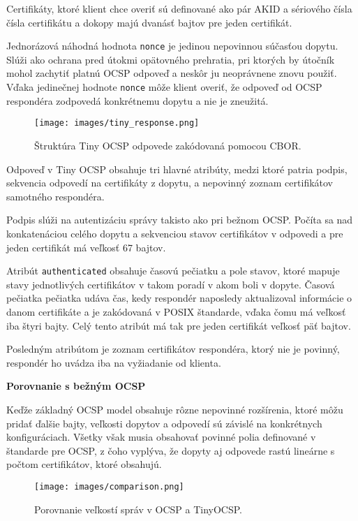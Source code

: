 \documentclass[12pt, twoside]{book}
\newcommand{\subsubsubsection}[1]{%
  \vspace{0.2em}  
  \textbf{#1} \\[0.2em]
  \hspace*{\parindent}
}
\begin{document}
Certifikáty, ktoré klient chce overiť sú definované ako pár AKID a sériového čísla 
čísla certifikátu a dokopy majú dvanásť bajtov pre jeden certifikát.

Jednorázová náhodná hodnota \texttt{nonce} je jedinou nepovinnou súčasťou dopytu.  Slúži ako ochrana pred útokmi opätovného prehratia, pri ktorých by útočník mohol zachytiť platnú OCSP odpoveď a neskôr ju neoprávnene znovu použiť. Vďaka jedinečnej hodnote \texttt{nonce} môže klient overiť, že odpoveď od OCSP respondéra zodpovedá konkrétnemu dopytu a nie je zneužitá.

\begin{figure}[H]
\centering
\texttt{[image: images/tiny\_response.png]}
\caption{Štruktúra Tiny OCSP odpovede zakódovaná pomocou CBOR.}
\end{figure}

Odpoveď v Tiny OCSP obsahuje tri hlavné atribúty, medzi ktoré patria podpis, sekvencia odpovedí na certifikáty z dopytu, a nepovinný zoznam certifikátov samotného respondéra.

Podpis slúži na autentizáciu správy takisto ako pri bežnom OCSP. Počíta sa nad konkatenáciou celého dopytu a sekvenciou stavov certifikátov v odpovedi a pre jeden certifikát má veľkosť 67 bajtov.

Atribút \texttt{authenticated} obsahuje časovú pečiatku a pole stavov, ktoré mapuje stavy jednotlivých certifikátov v takom poradí v akom boli v dopyte.
Časová pečiatka pečiatka udáva čas, kedy respondér naposledy aktualizoval informácie o danom certifikáte a je zakódovaná v POSIX štandarde, vďaka čomu má veľkosť iba štyri bajty. Celý tento atribút má tak pre jeden certifikát veľkosť päť bajtov.

Posledným atribútom je zoznam certifikátov respondéra, ktorý nie je povinný, respondér ho uvádza iba na vyžiadanie od klienta.


\subsubsubsection{Porovnanie s bežným OCSP}
Keďže základný OCSP model obsahuje rôzne nepovinné rozšírenia, ktoré môžu pridať ďalšie bajty, veľkosti dopytov a odpovedí sú závislé na konkrétnych konfiguráciach. Všetky však musia obsahovať povinné polia definované v štandarde pre OCSP, z čoho vyplýva, že dopyty aj odpovede rastú lineárne s počtom certifikátov, ktoré obsahujú.

\begin{figure}[H]
\centering
\texttt{[image: images/comparison.png]}
\caption{Porovnanie veľkostí správ v OCSP a TinyOCSP.}
\end{figure}
\end{document}
